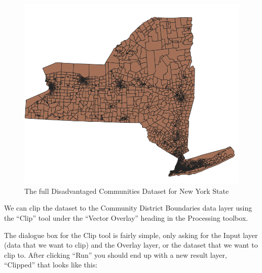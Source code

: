 \documentclass[
  letterpaper,
  DIV=11,
  numbers=noendperiod]{scrreprt}
\begin{document}
\begin{figure}

{\centering \includegraphics{./images/DisadvantagedCommunities_StateWide.png}

}

\caption{The full Disadvantaged Communities Dataset for New York State}

\end{figure}

We can clip the dataset to the Community District Boundaries data layer
using the ``Clip'' tool under the ``Vector Overlay'' heading in the
Processing toolbox.

The dialogue box for the Clip tool is fairly simple, only asking for the
Input layer (data that we want to clip) and the Overlay layer, or the
dataset that we want to clip to. After clicking ``Run'' you should end
up with a new result layer, ``Clipped'' that looks like this:
\end{document}

